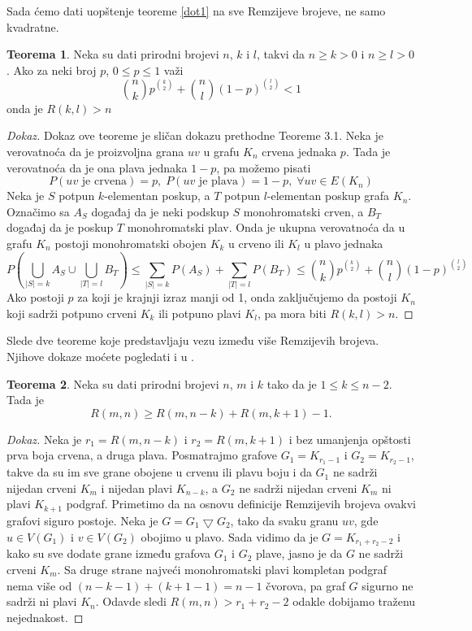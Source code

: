 \documentclass{article}
\theoremstyle{definition}
\newtheorem{teorema}{Teorema}[section]
\newcommand{\dokaz}[1]{\begin{proof}[Dokaz]#1\end{proof}}
\begin{document}
	Sada ćemo dati uopštenje teoreme \ref{dot1} na sve Remzijeve brojeve, ne samo kvadratne.
	\begin{teorema}\label{dot2}
		Neka su dati prirodni brojevi $n$, $k$ i $l$, takvi da $n \geq{k} > 0$ i $n \geq{l} > 0$. Ako za neki broj $p$, $0 \leq{p} \leq 1$ važi
		$$\binom{n}{k}p^{\binom{k}{2}} + \binom{n}{l}(1 - p)^{\binom{l}{2}} < 1$$ onda je $R(k,l) > n$
		\dokaz{
			Dokaz ove teoreme je sličan dokazu prethodne Teoreme 3.1. Neka je verovatnoća da je proizvoljna grana $uv$ u grafu $K_n$ crvena jednaka $p$. Tada je verovatnoća da je ona               	plava jednaka $1 - p$, pa možemo pisati 
			$$P(uv \text{ je crvena}) = p,\; P(uv \text{ je plava}) = 1 - p, \; \forall uv \in E(K_n)$$
			Neka je $S$ potpun $k$-elementan poskup, a $T$ potpun $l$-elementan poskup grafa $K_n$. Označimo sa $A_S$ događaj da je neki podskup $S$ monohromatski crven, a $B_T$ događaj  	da je poskup $T$ monohromatski plav. Onda je ukupna verovatnoća da u grafu $K_n$ postoji monohromatski obojen $K_k$ u crveno ili $K_l$ u plavo jednaka
			$$P\left(\bigcup_{|S|=k}A_S \cup \bigcup_{|T|=l}B_T \right) \leq \sum_{|S|=k}P(A_S) + \sum_{|T|=l}P(B_T) \leq \binom{n}{k}p^{\binom{k}{2}} + \binom{n}{l}(1 - p)^{\binom{l}{2}}$$
			Ako postoji $p$ za koji je krajnji izraz manji od 1, onda zaključujemo da postoji $K_n$  koji sadrži potpuno crveni $K_k$ ili potpuno plavi $K_l$, pa mora biti $R(k,l)>n$.
		}
	\end{teorema}
	Slede dve teoreme koje predstavljaju vezu između više Remzijevih brojeva. Njihove dokaze moćete pogledati i u \cite{Uzastopni Remzijevi brojevi}.
	\begin{teorema}\label{dot3}
		Neka su dati prirodni brojevi $n$, $m$ i $k$ tako da je $1\leq k \leq n - 2$. Tada je $$R(m,n) \geq R(m, n - k) + R(m, k + 1) - 1.$$ 
		\dokaz{
			Neka je $r_1 = R(m, n - k)$ i $r_2 = R(m, k + 1)$ i bez umanjenja opštosti prva boja crvena, a druga plava. Posmatrajmo grafove 
			$G_1 =K_{r_1 - 1}$ i $G_2 = K_{r_2 - 1}$, takve da su im sve grane obojene u crvenu ili plavu boju i da $G_1$ ne sadrži nijedan crveni $K_m$ i
			nijedan plavi $K_{n - k}$, a $G_2$ ne sadrži nijedan crveni $K_m$ ni plavi $K_{k + 1}$ podgraf. Primetimo da na osnovu definicije Remzijevih
			brojeva ovakvi grafovi siguro postoje. Neka je $G = G_1 \bigtriangledown G_2$, tako da svaku granu $uv$, gde $u \in V(G_1)$ i $v \in V(G_2)$
			obojimo u plavo. Sada vidimo da je $G = K_{r_1 + r_2 - 2}$ i kako su sve dodate grane između grafova $G_1$ i $G_2$ plave, jasno je da $G$ ne
			sadrži crveni $K_m$. Sa druge strane najveći monohromatski plavi kompletan podgraf nema više od $(n - k - 1) + (k + 1 - 1) = n - 1$ čvorova, pa 			graf $G$ sigurno ne sadrži ni plavi $K_n$. Odavde sledi $R(m,n) > r_1 + r_2 - 2$ odakle dobijamo traženu nejednakost. 
		}
	\end{teorema}
\end{document}
